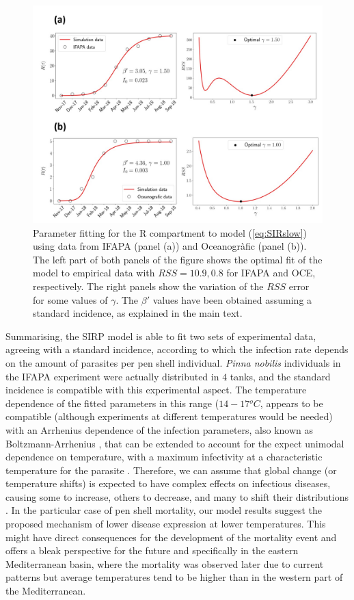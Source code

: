 \begin{figure}[H]
    \centering
    \includegraphics[width=1\textwidth]{Figures/approx_SIR_fitting.jpg}
    \caption{Parameter fitting for the R compartment to model
        (\cref{eq:SIRslow}) using data from IFAPA (panel (a)) and Oceanogràfic
        (panel
        (b)). The left part of both panels of the figure shows the optimal fit
        of the
        model to empirical data with $RSS=10.9, 0.8$ for IFAPA and OCE,
        respectively.
        The right panels show the variation of the $RSS$ error for some values
        of
        $\gamma$.  The $\beta'$ values have been obtained assuming a standard
        incidence, as explained in the main text.}
    \label{fig:approx_SIR_fit}
\end{figure}

Summarising, the SIRP model is able to fit two sets of experimental data,
agreeing with a standard incidence, according to which the infection rate
depends on the amount of parasites per pen shell individual. \textit{Pinna
    nobilis} individuals in
the IFAPA experiment were actually distributed in $4$ tanks, and the
standard incidence is compatible with this experimental aspect. The temperature
dependence of the fitted parameters in this range ($14-17 {}^o C$, appears to
be compatible (although experiments at different temperatures would be needed)
with an Arrhenius dependence of the infection parameters, also known as
Boltzmann-Arrhenius
\cite{Brown2004,Molnar2017}, that can be extended to account for the
expect unimodal dependence on temperature, with a maximum infectivity at a
characteristic temperature for the parasite \cite{Molnar2017}. Therefore, we
can assume that global change (or temperature shifts) is expected to have
complex effects on infectious diseases, causing some to increase, others to
decrease, and many to shift their distributions \cite{Rohr2020}.
In the particular case of pen shell mortality, our model results suggest the
proposed mechanism of lower disease expression at lower temperatures. This
might have direct consequences for the development of the mortality event and
offers a bleak perspective for the future and specifically in the eastern
Mediterranean basin, where the mortality was observed later due to current
patterns but average temperatures tend to be higher than in the western part of
the Mediterranean.

